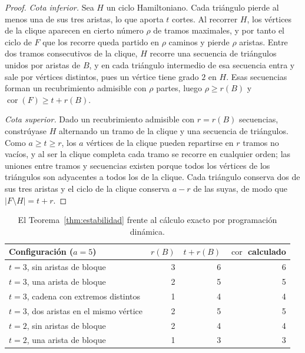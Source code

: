 \documentclass[11pt,a4paper]{article}
\theoremstyle{definition}
\theoremstyle{remark}
\begin{document}
\begin{proof}
\emph{Cota inferior.} Sea $H$ un ciclo Hamiltoniano. Cada triángulo pierde al menos una de sus tres aristas, lo que aporta $t$ cortes. Al recorrer $H$, los vértices de la clique aparecen en cierto número $\rho$ de tramos maximales, y por tanto el ciclo de $F$ que los recorre queda partido en $\rho$ caminos y pierde $\rho$ aristas. Entre dos tramos consecutivos de la clique, $H$ recorre una secuencia de triángulos unidos por aristas de $B$, y en cada triángulo intermedio de esa secuencia entra y sale por vértices distintos, pues un vértice tiene grado $2$ en $H$. Esas secuencias forman un recubrimiento admisible con $\rho$ partes, luego $\rho\ge r(B)$ y $\operatorname{cor}(F)\ge t+r(B)$.

\emph{Cota superior.} Dado un recubrimiento admisible con $r=r(B)$ secuencias, constrúyase $H$ alternando un tramo de la clique y una secuencia de triángulos. Como $a\ge t\ge r$, los $a$ vértices de la clique pueden repartirse en $r$ tramos no vacíos, y al ser la clique completa cada tramo se recorre en cualquier orden; las uniones entre tramos y secuencias existen porque todos los vértices de los triángulos son adyacentes a todos los de la clique. Cada triángulo conserva dos de sus tres aristas y el ciclo de la clique conserva $a-r$ de las suyas, de modo que $|F\setminus H|=t+r$.
\end{proof}

\begin{table}[h]
\centering
\begin{tabular}{lrrr}
\toprule
Configuración ($a=5$) & $r(B)$ & $t+r(B)$ & $\operatorname{cor}$ calculado\\
\midrule
$t=3$, sin aristas de bloque & 3 & 6 & 6\\
$t=3$, una arista de bloque & 2 & 5 & 5\\
$t=3$, cadena con extremos distintos & 1 & 4 & 4\\
$t=3$, dos aristas en el mismo vértice & 2 & 5 & 5\\
$t=2$, sin aristas de bloque & 2 & 4 & 4\\
$t=2$, una arista de bloque & 1 & 3 & 3\\
\bottomrule
\end{tabular}
\caption{El Teorema~\ref{thm:estabilidad} frente al cálculo exacto por programación dinámica.}\label{tab:estabilidad}
\end{table}
\end{document}
